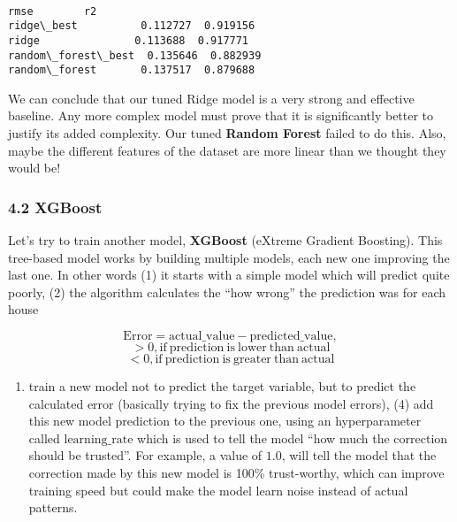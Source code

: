 \documentclass[11pt]{article}
\makeatletter
\providecommand{\tightlist}{%
      \setlength{\itemsep}{0pt}\setlength{\parskip}{0pt}}
\newcommand{\boxspacing}{\kern\kvtcb@left@rule\kern\kvtcb@boxsep}
\newcommand{\prompt}[4]{
        {\ttfamily\llap{{\color{#2}[#3]:\hspace{3pt}#4}}\vspace{-\baselineskip}}
    }
\makeatother
\begin{document}
    \begin{center}
    \end{center}
    { \hspace*{\fill} \\}
    
            \begin{tcolorbox}[breakable, size=fbox, boxrule=.5pt, pad at break*=1mm, opacityfill=0]
\prompt{Out}{outcolor}{30}{\boxspacing}
\begin{Verbatim}[commandchars=\\\{\}]
                        rmse        r2
ridge\_best          0.112727  0.919156
ridge               0.113688  0.917771
random\_forest\_best  0.135646  0.882939
random\_forest       0.137517  0.879688
\end{Verbatim}
\end{tcolorbox}
        
    We can conclude that our tuned Ridge model is a very strong and
effective baseline. Any more complex model must prove that it is
significantly better to justify its added complexity. Our tuned
\textbf{Random Forest} failed to do this. Also, maybe the different
features of the dataset are more linear than we thought they would be!

    \subsubsection{4.2 XGBoost}\label{xgboost}

    Let's try to train another model, \textbf{XGBoost} (eXtreme Gradient
Boosting). This tree-based model works by building multiple models, each
new one improving the last one. In other words (1) it starts with a
simple model which will predict quite poorly, (2) the algorithm
calculates the ``how wrong'' the prediction was for each house

\[\mathrm{Error}=\mathrm{actual\_value} - \mathrm{predicted\_value},\]
\[> 0, \mathrm{if\ prediction\ is\ lower\ than\ actual}\]
\[< 0, \mathrm{if\ prediction\ is\ greater\ than\ actual}\]

\begin{enumerate}
\def\labelenumi{(\arabic{enumi})}
\setcounter{enumi}{2}
\tightlist
\item
  train a new model not to predict the target variable, but to predict
  the calculated error (basically trying to fix the previous model
  errors), (4) add this new model prediction to the previous one, using
  an hyperparameter called \(\mathrm{learning\_rate}\) which is used to
  tell the model ``how much the correction should be trusted''. For
  example, a value of \(1.0\), will tell the model that the correction
  made by this new model is 100\% trust-worthy, which can improve
  training speed but could make the model learn noise instead of actual
  patterns.
\end{enumerate}
\end{document}
